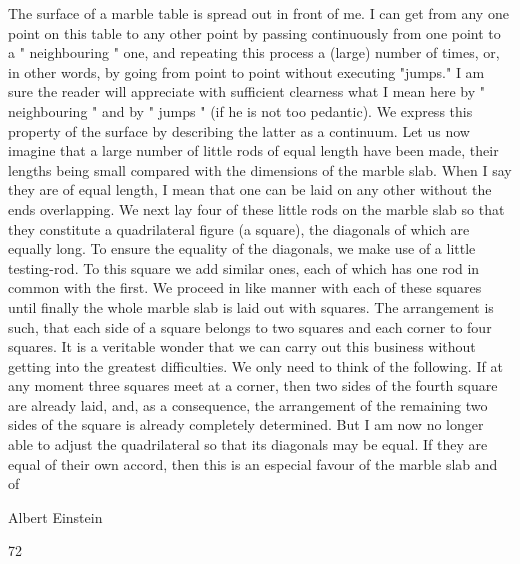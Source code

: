 \documentclass{article}
\begin{document}
The surface of a marble table is spread out in front of me. I can get from any one point on
this table to any other point by passing continuously from one point to a " neighbouring "
one, and repeating this process a (large) number of times, or, in other words, by going from
point to point without executing "jumps." I am sure the reader will appreciate with
sufficient clearness what I mean here by " neighbouring " and by " jumps " (if he is not too
pedantic). We express this property of the surface by describing the latter as a continuum.
Let us now imagine that a large number of little rods of equal length have been made,
their lengths being small compared with the dimensions of the marble slab. When I say they
are of equal length, I mean that one can be laid on any other without the ends overlapping.
We next lay four of these little rods on the marble slab so that they constitute a quadrilateral
figure (a square), the diagonals of which are equally long. To ensure the equality of the
diagonals, we make use of a little testing-rod. To this square we add similar ones, each of
which has one rod in common with the first. We proceed in like manner with each of these
squares until finally the whole marble slab is laid out with squares. The arrangement is
such, that each side of a square belongs to two squares and each corner to four squares.
It is a veritable wonder that we can carry out this business without getting into the
greatest difficulties. We only need to think of the following. If at any moment three squares
meet at a corner, then two sides of the fourth square are already laid, and, as a consequence,
the arrangement of the remaining two sides of the square is already completely determined.
But I am now no longer able to adjust the quadrilateral so that its diagonals may be equal. If
they are equal of their own accord, then this is an especial favour of the marble slab and of

Albert Einstein

72
\end{document}
